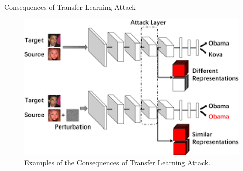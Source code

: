 \begin{frame}{Consequences of Transfer Learning Attack}
    \begin{figure}[h]
        \centering
        \begin{minipage}{0.4\textwidth} %
            \centering
            \includegraphics[width=\textwidth]{img/consequence.png} %
        \end{minipage}
        \begin{minipage}{0.35\textwidth} %
            \caption{Examples of the Consequences of Transfer Learning Attack.}
            \label{fig:transfer-attack}
        \end{minipage}%
    \end{figure}
\end{frame}

